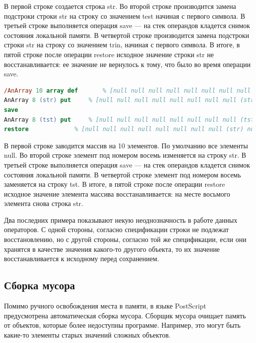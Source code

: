 \documentclass[14pt]{extarticle}
\begin{document}
В первой строке создается строка str. Во второй строке производится замена подстроки строки str на строку со значением test начиная с первого символа.  В третьей строке выполняется операция save --- на стек операндов кладется снимок состояния локальной памяти. В четвертой строке производится замена подстроки строки str на строку со значением trin, начиная с первого символа. В итоге, в пятой строке после операции restore исходное значение строки str не восстанавливается: ее значение не вернулось к тому, что было во время операции save. 


\begin{lstlisting}[label=PostScript-example,caption=Изменение значения массива, frame = single, language = PostScript]
/AnArray 10 array def		% [null null null null null null null null null null]
AnArray 8 (str) put		% [null null null null null null null null (str) null]
save
AnArray 8 (tst) put		% [null null null null null null null null (tst) null]
restore				% [null null null null null null null null (str) null]
\end{lstlisting}


В первой строке заводится массив на 10 элементов. По умолчанию все элементы null. Во второй строке элемент под номером восемь изменяется на строку str.  В третьей строке выполняется операция save --- на стек операндов кладется снимок состояния локальной памяти. В четвертой строке элемент под номером восемь заменяется на строку tst. В итоге, в пятой строке после операции restore исходное значение элемента массива восстанавливается: на месте восьмого элемента снова строка str. 

Два последних примера показывают некую неоднозначность в работе данных операторов. С одной стороны, согласно спецификации строки не подлежат восстановлению, но с другой стороны, согласно той же спецификации, если они хранятся в качестве значения какого-то другого объекта, то их значение восстанавливается к исходному перед сохранением.

\subsection{Сборка мусора}
Помимо ручного освобождения места в памяти, в языке PostScript предусмотрена автоматическая сборка мусора. Сборщик мусора очищает память от объектов, которые более недоступны программе. Например, это могут быть какие-то элементы старых значений сложных объектов.
\end{document}
